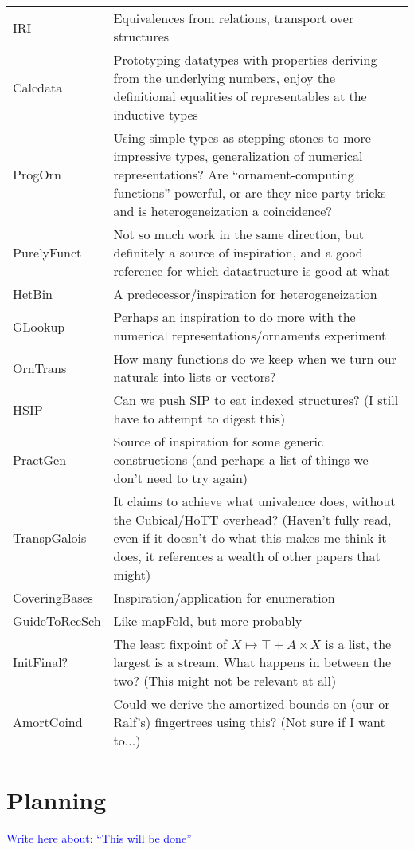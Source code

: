 \documentclass{article}
\theoremstyle{plain}%
\theoremstyle{definition}
\newcommand{\towrite}[1]{\par\textcolor{blue}{Write here about: ``#1''}\par}
\begin{document}
\begin{tabular}{l l}
    IRI           & Equivalences from relations, transport over structures \\ 
    Calcdata      & Prototyping datatypes with properties deriving from the underlying numbers, enjoy the definitional equalities of representables at the inductive types \\  
    ProgOrn       & Using simple types as stepping stones to more impressive types, generalization of numerical representations? Are ``ornament-computing functions'' powerful, or are they nice party-tricks and is heterogeneization a coincidence? \\  
    PurelyFunct   & Not so much work in the same direction, but definitely a source of inspiration, and a good reference for which datastructure is good at what \\
    HetBin        & A predecessor/inspiration for heterogeneization \\
    GLookup       & Perhaps an inspiration to do more with the numerical representations/ornaments experiment \\
    OrnTrans      & How many functions do we keep when we turn our naturals into lists or vectors? \\
    HSIP          & Can we push SIP to eat indexed structures? (I still have to attempt to digest this) \\
    PractGen      & Source of inspiration for some generic constructions (and perhaps a list of things we don't need to try again) \\
    TranspGalois  & It claims to achieve what univalence does, without the Cubical/HoTT overhead? (Haven't fully read, even if it doesn't do what this makes me think it does, it references a wealth of other papers that might) \\
    CoveringBases & Inspiration/application for enumeration \\
    GuideToRecSch & Like mapFold, but more probably \\
    InitFinal?    & The least fixpoint of $X \mapsto \top + A \times X$ is a list, the largest is a stream. What happens in between the two? (This might not be relevant at all) \\
    AmortCoind    & Could we derive the amortized bounds on (our or Ralf's) fingertrees using this? (Not sure if I want to...)
\end{tabular}


\section{Planning}\label{sec:planning}
\towrite{This will be done}
\end{document}
